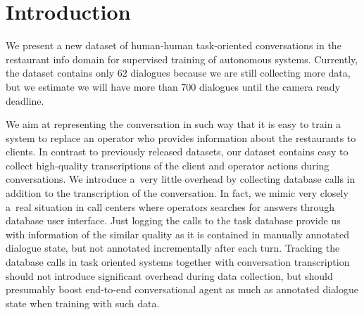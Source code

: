 \documentclass[runningheads,a4paper]{llncs}
\def\OP#1{#1}  %
\begin{document}
\section{Introduction}\label{sec:intro}
\vspace{-0.50em}
We present a new dataset of human-human task-oriented conversations in the restaurant info domain for supervised training of autonomous systems. 
Currently, the dataset contains only \OP{62} dialogues because we are still collecting more data, but we estimate we will have more than 700 dialogues until the camera ready deadline. 

We aim at representing the conversation in such way that it is easy to train a system to replace an operator who provides information about the restaurants to clients.
In contrast to previously released datasets, our dataset contains easy to collect high-quality transcriptions of the client and operator actions during conversations.
We introduce a~very little overhead by collecting database calls in addition to the transcription of the conversation. 
In fact, we mimic very closely a~real situation in call centers where operators searches for answers through database user interface. 
Just logging the calls to the task database provide us with information of the similar quality as it is contained in manually annotated dialogue state, but not annotated incrementally after each turn.
Tracking the database calls in task oriented systems together with conversation transcription should not introduce significant overhead during data collection, but should presumably boost end-to-end conversational agent as much as annotated dialogue state when training with such data.
\end{document}
